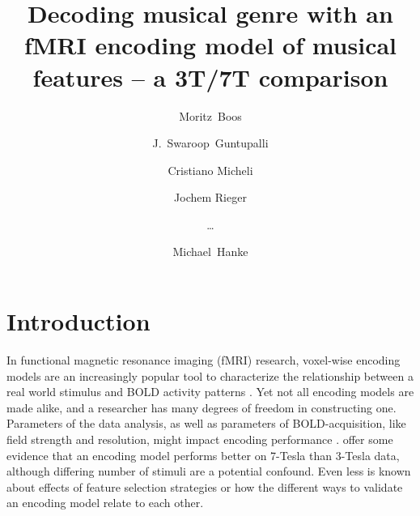



\title{Decoding musical genre with an fMRI encoding model of musical
features -- a 3T/7T comparison}


\author[1]{Moritz~Boos}
\author[2]{J.~Swaroop~Guntupalli}
\author[1]{Cristiano Micheli}
\author[1]{Jochem Rieger}
\author[0]{\ldots}
\author[3,4]{Michael~Hanke}

\maketitle
\thispagestyle{fancy}

\listoftodos

\begin{abstract}

\end{abstract}

\clearpage


\section*{Introduction}

In functional magnetic resonance imaging (f{MRI}) research, voxel-wise encoding
models are an increasingly popular tool to characterize the relationship
between a real world stimulus and BOLD activity patterns
\citep{NG11,TD+06,KG+08,SZ09}.  Yet not all encoding models are made alike, and
a researcher has many degrees of freedom in constructing one.  Parameters of
the data analysis, as well as parameters of BOLD-acquisition, like field
strength and resolution, might impact encoding performance \citep{KB07,FK12}.
\citet{SF14} offer some evidence that an encoding model performs better on
7-Tesla than 3-Tesla data, although differing number of stimuli are a potential
confound.  Even less is known about effects of feature selection strategies or
how the different ways to validate an encoding model relate to each other.

